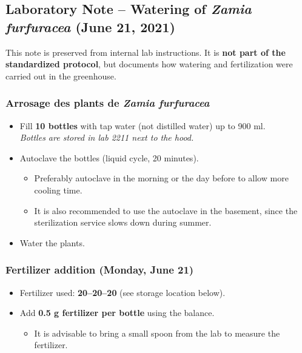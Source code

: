 \documentclass[
  11pt,
]{article}
\providecommand{\tightlist}{%
  \setlength{\itemsep}{0pt}\setlength{\parskip}{0pt}}
\begin{document}
\subsection{\texorpdfstring{Laboratory Note -- Watering of \emph{Zamia
furfuracea} (June 21,
2021)}{Laboratory Note -- Watering of Zamia furfuracea (June 21, 2021)}}\label{laboratory-note-watering-of-zamia-furfuracea-june-21-2021}

This note is preserved from internal lab instructions. It is \textbf{not
part of the standardized protocol}, but documents how watering and
fertilization were carried out in the greenhouse.

\subsubsection{\texorpdfstring{Arrosage des plants de \emph{Zamia
furfuracea}}{Arrosage des plants de Zamia furfuracea}}\label{arrosage-des-plants-de-zamia-furfuracea}

\begin{itemize}
\tightlist
\item
  Fill \textbf{10 bottles} with tap water (not distilled water) up to
  900 ml.\\
  \emph{Bottles are stored in lab 2211 next to the hood.}\\
\item
  Autoclave the bottles (liquid cycle, 20 minutes).

  \begin{itemize}
  \tightlist
  \item
    Preferably autoclave in the morning or the day before to allow more
    cooling time.\\
  \item
    It is also recommended to use the autoclave in the basement, since
    the sterilization service slows down during summer.\\
  \end{itemize}
\item
  Water the plants.
\end{itemize}

\subsubsection{Fertilizer addition (Monday, June
21)}\label{fertilizer-addition-monday-june-21}

\begin{itemize}
\tightlist
\item
  Fertilizer used: \textbf{20--20--20} (see storage location below).\\
\item
  Add \textbf{0.5 g fertilizer per bottle} using the balance.

  \begin{itemize}
  \tightlist
  \item
    It is advisable to bring a small spoon from the lab to measure the
    fertilizer.
  \end{itemize}
\end{itemize}
\end{document}
